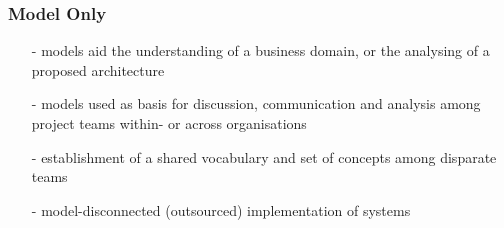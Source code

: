 %
%
%
%
%
%
%

\subsubsection{Model Only}
\label{model_only_heading}

\begin{itemize}
    \item[-] models aid the understanding of a business domain, or the analysing
        of a proposed architecture
    \item[-] models used as basis for discussion, communication and analysis
        among project teams within- or across organisations
    \item[-] establishment of a shared vocabulary and set of concepts among
        disparate teams
    \item[-] model-disconnected (outsourced) implementation of systems
\end{itemize}
